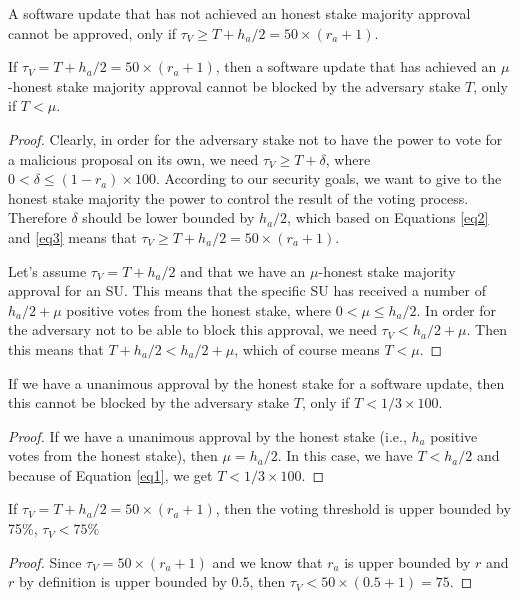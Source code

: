 \begin{theorem}
A software update that has not achieved an honest stake majority approval cannot be approved, only if $\tau_V \geq T + h_a/2 =  50 \times (r_a + 1)$.

If $\tau_V = T + h_a/2 =  50 \times (r_a + 1)$, then a software update that has achieved an $\mu$-honest stake majority approval cannot be blocked by the adversary stake $T$, only if $T < \mu$.
\end{theorem}
\begin{proof}
Clearly, in order for the adversary stake not to have the power to vote for a malicious proposal on its own, we need $\tau_V \geq T + \delta$, where $0 < \delta \leq (1-r_a) \times 100$. According to our security goals, we want to give to the honest stake majority the power to control the result of the voting process. Therefore $\delta$ should be lower bounded by $h_a/2$, which based on Equations \ref{eq2} and \ref{eq3} means that $\tau_V \geq T + h_a/2 =  50 \times (r_a + 1)$.

Let's assume $\tau_V = T + h_a/2$ and that we have an $\mu$-honest stake majority approval for an SU. This means that the specific SU has received a number of $h_a/2 + \mu$ positive votes from the honest stake, where $0 < \mu \leq h_a/2$. In order for the adversary not to be able to block this approval, we need $\tau_V < h_a/2 +\mu$. Then this means that $T + h_a/2 < h_a/2 + \mu$, which of course means $T < \mu$. 
\end{proof}

\begin{lemma}
If we have a unanimous approval by the honest stake for a software update, then this cannot be blocked by the adversary stake $T$, only if $T < 1/3 \times 100$.
\end{lemma}
\begin{proof}
If we have a unanimous approval by the honest stake (i.e., $h_a$ positive votes from the honest stake), then $\mu = h_a/2$. In this case, we have $T < h_a/2$ and because of Equation \ref{eq1}, we get $T < 1/3 \times 100$.
\end{proof}

\begin{lemma}
If $\tau_V = T + h_a/2 =  50 \times (r_a + 1)$, then the voting threshold is upper bounded by 75\%, $\tau_V < 75\%$
\end{lemma}
\begin{proof}
Since $\tau_V =  50 \times (r_a + 1)$ and we know that $r_a$ is upper bounded by $r$ and $r$ by definition is upper bounded by $0.5$, then $\tau_V <  50 \times (0.5 + 1) = 75$.
\end{proof}



